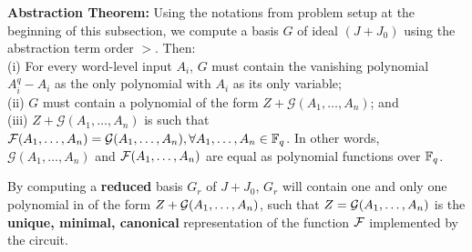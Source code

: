 \begin{Theorem}
{\bf Abstraction Theorem:} Using the notations from problem setup at the beginning of this subsection,
we compute a \Grobner basis $G$ of ideal $(J+J_0)$ using the abstraction term 
order $>$. Then: \\
(i) For every word-level input $A_i$, $G$ must contain the vanishing 
polynomial $A_i^q - A_i$ as the only polynomial with $A_i$ as its only 
variable;\\
(ii) $G$ must contain a polynomial of the form 
$Z + \mathcal{G}(A_1,\dots,A_n)$; and\\ 
(iii) $Z + \mathcal{G}(A_1,\dots,A_n)$ is such that 
${\mathcal{F}}(A_1,\dots,A_n) = {\mathcal{G}}(A_1,\dots,A_n),
\forall A_1,\dots,A_n \in {\mathbb{F}}_{q}$. 
In other words, ${\mathcal{G}}(A_1,\dots,A_n)$ and ${\mathcal{F}}(A_1,\dots,A_n)$ are
equal as polynomial functions over ${\mathbb{F}}_{q}$.
\label{thm:abs}
\end{Theorem}

\begin{Corollary}
By computing a {\bf reduced} \Grobner basis $G_r$ of $J + J_0$, 
$G_r$ will contain one and only one polynomial in of the form 
$Z + {\mathcal{G}}(A_1,\dots,A_n)$, such that $Z = {\mathcal{G}}(A_1,\dots,A_n)$ is the 
{\bf unique, minimal, canonical} representation of the function 
${\mathcal{F}}$ implemented by the circuit.  
\end{Corollary}


